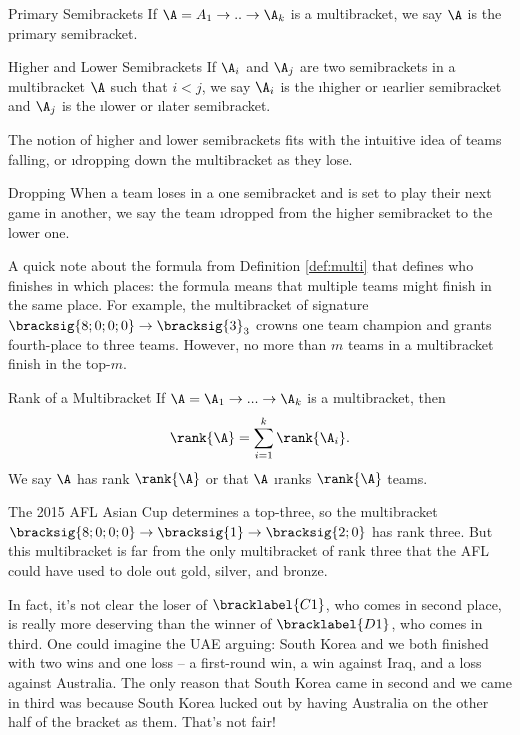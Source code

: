 {    \begin{definition}{Primary Semibrackets}{}
        If $\A = A_1 \to .. \to \A_k$ is a multibracket, we say $\A$ is the primary semibracket.
    \end{definition}

    \begin{definition}{Higher and Lower Semibrackets}{}
        If $\A_i$ and $\A_j$ are two semibrackets in a multibracket $\A$ such that $i < j$, we say $\A_i$ is the \i{higher} or \i{earlier} semibracket and $\A_j$ is the \i{lower} or \i{later} semibracket.
    \end{definition}

    The notion of higher and lower semibrackets fits with the intuitive idea of teams falling, or \i{dropping} down the multibracket as they lose.
    
    \begin{definition}{Dropping}{}
        When a team loses in a one semibracket and is set to play their next game in another, we say the team \i{dropped} from the higher semibracket to the lower one.
    \end{definition}

    A quick note about the formula from Definition \ref{def:multi} that defines who finishes in which places: the formula means that multiple teams might finish in the same place. For example, the multibracket of signature $\bracksig{8;0;0;0} \to \bracksig{3}_3$ crowns one team champion and grants fourth-place to three teams. However, no more than $m$ teams in a multibracket finish in the top-$m$.

    \begin{definition}{Rank of a Multibracket}{}
        If $\A = \A_1 \to ... \to \A_k$ is a multibracket, then $$\rank{\A} = \sum_{i=1}^k \rank{\A_i}.$$ We say $\A$ has rank $\rank{\A}$ or that $\A$ \i{ranks} $\rank{\A}$ teams.
    \end{definition}

    The 2015 AFL Asian Cup determines a top-three, so the multibracket $\bracksig{8;0;0;0} \to \bracksig{1} \to \bracksig{2;0}$ has rank three. But this multibracket is far from the only multibracket of rank three that the AFL could have used to dole out gold, silver, and bronze.
    
    In fact, it's not clear the loser of $\bracklabel{C1}$, who comes in second place, is really more deserving than the winner of $\bracklabel{D1}$, who comes in third. One could imagine the UAE arguing: South Korea and we both finished with two wins and one loss -- a first-round win, a win against Iraq, and a loss against Australia. The only reason that South Korea came in second and we came in third was because South Korea lucked out by having Australia on the other half of the bracket as them. That's not fair!

}
